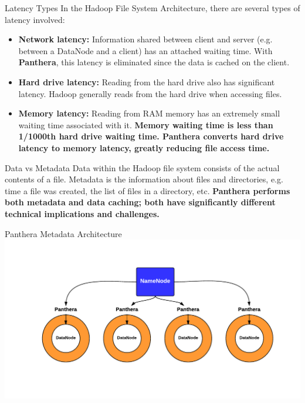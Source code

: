 \documentclass[final]{beamer} %
\begin{document}
\begin{frame}
\begin{columns}[t]
\begin{column}{0.32\textwidth}
	  \begin{block}{Latency Types}
		In the Hadoop File System Architecture, there are several types of latency involved:
		\begin{itemize}
		\item \textbf{Network latency: } Information shared between client and server (e.g. between a DataNode and a client) has an attached waiting time. With \textbf{Panthera}, this latency is eliminated since the data is cached on the client.
		\item \textbf{Hard drive latency: } Reading from the hard drive also has significant latency. Hadoop generally reads from the hard drive when accessing files.
		\item \textbf{Memory latency: } Reading from RAM memory has an extremely small
		waiting time associated with it. \textbf{Memory waiting time is less than 1/1000th hard drive waiting time. Panthera converts hard drive latency to memory latency, greatly reducing file access time.}
		\end{itemize}
	  \end{block}
	  
		\begin{block}{Data vs Metadata}
			Data within the Hadoop file system consists of the actual contents of a file.
			Metadata is the information about files and directories, e.g. time a file was created, the list of files in a directory, etc. \textbf{Panthera performs both metadata
			and data caching; both have significantly different technical implications
			and challenges.}
		\end{block}
	  \begin{block}{Panthera Metadata Architecture}
	  \includegraphics[scale=1.2]{assets/panthera_metadata.pdf}
      \end{block}
      

\end{column}
\end{columns}
\end{frame}
\end{document}
